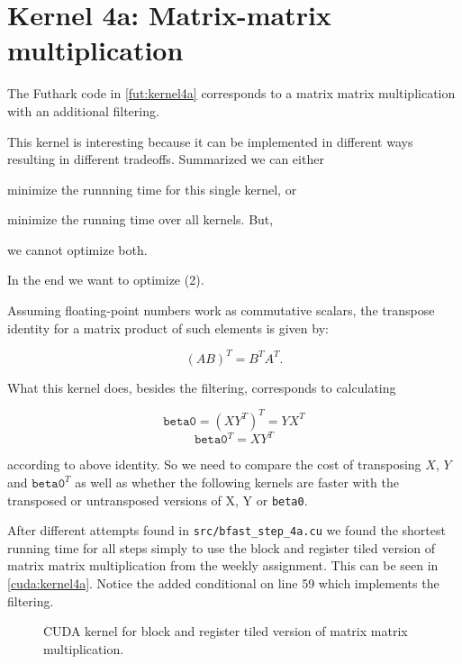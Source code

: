 \section{Kernel 4a:  Matrix-matrix multiplication}

The Futhark code in \autoref{fut:kernel4a} corresponds to a matrix matrix
multiplication with an additional filtering. 

This kernel is interesting because it can be implemented in different ways
resulting in different tradeoffs. Summarized we can either 

\begin{enumerate*}
    \item minimize the runnning time for this single kernel, or
    \item minimize the running time over all kernels. But,
    \item we cannot optimize both.
\end{enumerate*}

In the end we want to optimize (2).

Assuming floating-point numbers work as commutative scalars, the transpose
identity for a matrix product of such elements is given by:

\[ (AB)^T = B^T A^T. \]

What this kernel does, besides the filtering, corresponds to calculating

\[ \texttt{beta0} = (XY^T)^T = YX^T \]
\[ \texttt{beta0}^T = XY^T \]

according to above identity. So we need to compare the cost of transposing
\(X\), \(Y\) and \(\texttt{beta0}^T\) as well as whether the following kernels
are faster with the transposed or untransposed versions of X, Y or
\texttt{beta0}. 

After different attempts found in \texttt{src/bfast\_step\_4a.cu} we found the
shortest running time for all steps simply to use the block and register tiled
version of matrix matrix multiplication from the weekly assignment. This can be
seen in \autoref{cuda:kernel4a}. Notice the added conditional on line 59 which
implements the filtering.

\begin{figure}[H]
    \centering
    \caption{}
    \label{fut:kernel4a}
\end{figure}

\begin{figure}[H]
    \centering
    \caption{CUDA kernel for block and register tiled version of matrix matrix
    multiplication.}
    \label{cuda:kernel4a}
\end{figure}
